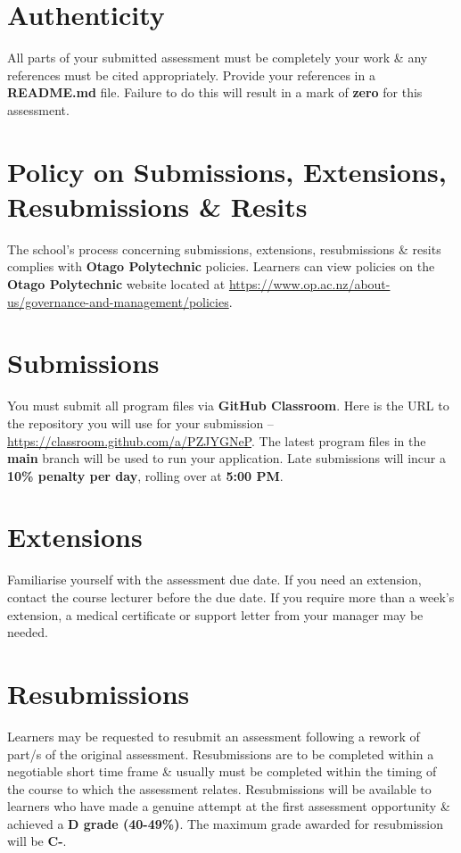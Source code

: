 \documentclass{article}
\begin{document}
\section*{Authenticity}
All parts of your submitted assessment must be completely your work \& any references must be cited appropriately. Provide your references in a \textbf{README.md} file. Failure to do this will result in a mark of \textbf{zero} for this assessment.

\section*{Policy on Submissions, Extensions, Resubmissions \& Resits}
The school's process concerning submissions, extensions, resubmissions \& resits complies with \textbf{Otago Polytechnic} policies. Learners can view policies on the \textbf{Otago Polytechnic} website located at \href{https://www.op.ac.nz/about-us/governance-and-management/policies}{https://www.op.ac.nz/about-us/governance-and-management/policies}.

\section*{Submissions}
You must submit all program files via \textbf{GitHub Classroom}. Here is the URL to the repository you will use for your submission – \href{https://classroom.github.com/a/PZJYGNeP}{https://classroom.github.com/a/PZJYGNeP}. The latest program files in the \textbf{main} branch will be used to run your application. Late submissions will incur a \textbf{10\% penalty per day}, rolling over at \textbf{5:00 PM}.

\section*{Extensions}
Familiarise yourself with the assessment due date. If you need an extension, contact the course lecturer before the due date. If you require more than a week's extension, a medical certificate or support letter from your manager may be needed.

\section*{Resubmissions}
Learners may be requested to resubmit an assessment following a rework of part/s of the original assessment. Resubmissions are to be completed within a negotiable short time frame \& usually must be completed within the timing of the course to which the assessment relates. Resubmissions will be available to learners who have made a genuine attempt at the first assessment opportunity \& achieved a \textbf{D grade (40-49\%)}. The maximum grade awarded for resubmission will be \textbf{C-}.
\end{document}
